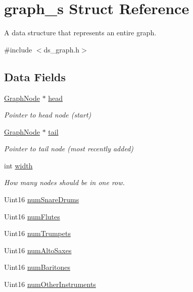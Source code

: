 \hypertarget{structgraph__s}{}\section{graph\+\_\+s Struct Reference}
\label{structgraph__s}


A data structure that represents an entire graph.  




{\ttfamily \#include $<$ds\+\_\+graph.\+h$>$}

\subsection*{Data Fields}
\begin{DoxyCompactItemize}
\item 
\hyperlink{ds__graph_8h_aacd6aa952164ec63f7de5c1d413f49a5}{Graph\+Node} $\ast$ \hyperlink{structgraph__s_a14d4df7f6c1f9d2c91c64b716680b8c8}{head}
\begin{DoxyCompactList}\small\item\em Pointer to head node (start) \end{DoxyCompactList}\item 
\hyperlink{ds__graph_8h_aacd6aa952164ec63f7de5c1d413f49a5}{Graph\+Node} $\ast$ \hyperlink{structgraph__s_ac3263bb2bbf0b4404d76fbbba2c036c9}{tail}
\begin{DoxyCompactList}\small\item\em Pointer to tail node (most recently added) \end{DoxyCompactList}\item 
int \hyperlink{structgraph__s_a2474a5474cbff19523a51eb1de01cda4}{width}
\begin{DoxyCompactList}\small\item\em How many nodes should be in one row. \end{DoxyCompactList}\item 
Uint16 \hyperlink{structgraph__s_a5ed7381790782351b9a8e4283b1d2abd}{num\+Snare\+Drums}
\item 
Uint16 \hyperlink{structgraph__s_ac587abf040d7f36a88e9e4a9f782e920}{num\+Flutes}
\item 
Uint16 \hyperlink{structgraph__s_a97a3d2a9434f13d7f1bfe83f40aa3252}{num\+Trumpets}
\item 
Uint16 \hyperlink{structgraph__s_a3dfd862f54e2c1060394efb8162fe91f}{num\+Alto\+Saxes}
\item 
Uint16 \hyperlink{structgraph__s_a23e654bd85fc7df1caba0a10a6e70bed}{num\+Baritones}
\item 
Uint16 \hyperlink{structgraph__s_aa0c8e54b3c22839b437ddf389421f0b8}{num\+Other\+Instruments}
\end{DoxyCompactItemize}


